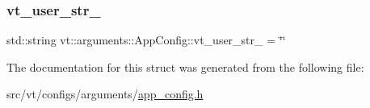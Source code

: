 \subsubsection{\texorpdfstring{vt\+\_\+user\+\_\+str\+\_}{vt\_user\_str\_3}}
{\footnotesize\ttfamily std\+::string vt\+::arguments\+::\+App\+Config\+::vt\+\_\+user\+\_\+str\+\_ = \char`\"{}\char`\"{}}



The documentation for this struct was generated from the following file\+:\begin{DoxyCompactItemize}
\item 
src/vt/configs/arguments/\hyperlink{app__config_8h}{app\+\_\+config.\+h}\end{DoxyCompactItemize}
